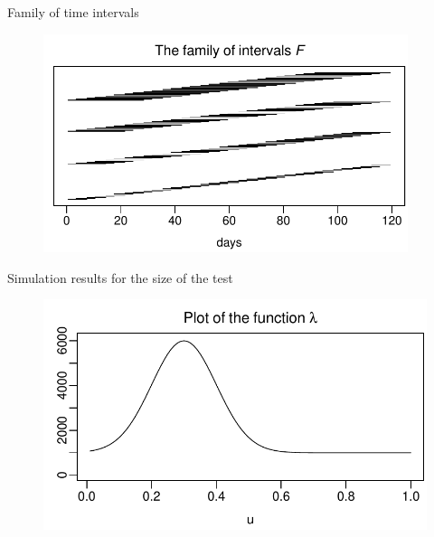 \documentclass[10pt]{beamer}
\begin{document}
\begin{frame}{Family of time intervals}
	\begin{figure}
		\includegraphics[width=0.95\textwidth]{plots/all_intervals}
	\end{figure}
\end{frame}

\begin{frame}{Simulation results for the size of the test}
\begin{figure}[t!]
	\includegraphics[height = 0.4\textheight]{plots/lambda_fct}
\end{figure}
\vspace{-2mm}
\scriptsize{\begin{table}[t]
\begin{center}
\caption{Size of the multiscale test}
\label{tab:size_shape}

\end{center}
\end{table}}
\end{frame}
\end{document}
